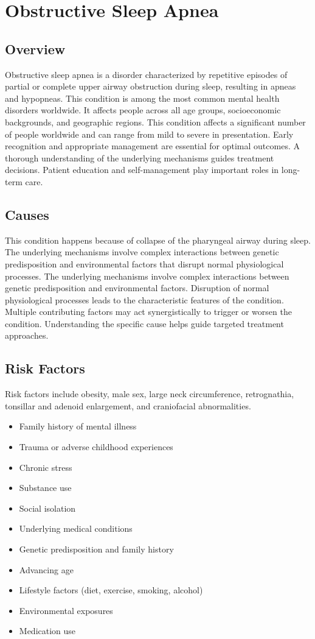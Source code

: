 \chapter{Obstructive Sleep Apnea}
\label{sec:throat:Obstructive Sleep Apnea}

\section{Overview}
Obstructive sleep apnea is a disorder characterized by repetitive episodes of partial or complete upper airway obstruction during sleep, resulting in apneas and hypopneas. This condition is among the most common mental health disorders worldwide. It affects people across all age groups, socioeconomic backgrounds, and geographic regions. This condition affects a significant number of people worldwide and can range from mild to severe in presentation. Early recognition and appropriate management are essential for optimal outcomes. A thorough understanding of the underlying mechanisms guides treatment decisions. Patient education and self-management play important roles in long-term care.
\section{Causes}
This condition happens because of collapse of the pharyngeal airway during sleep. The underlying mechanisms involve complex interactions between genetic predisposition and environmental factors that disrupt normal physiological processes. The underlying mechanisms involve complex interactions between genetic predisposition and environmental factors. Disruption of normal physiological processes leads to the characteristic features of the condition. Multiple contributing factors may act synergistically to trigger or worsen the condition. Understanding the specific cause helps guide targeted treatment approaches.
\section{Risk Factors}
Risk factors include obesity, male sex, large neck circumference, retrognathia, tonsillar and adenoid enlargement, and craniofacial abnormalities.

\begin{itemize}[noitemsep]
  \item Family history of mental illness
  \item Trauma or adverse childhood experiences
  \item Chronic stress
  \item Substance use
  \item Social isolation
  \item Underlying medical conditions
  \item Genetic predisposition and family history
  \item Advancing age
  \item Lifestyle factors (diet, exercise, smoking, alcohol)
  \item Environmental exposures
  \item Medication use
\end{itemize}
